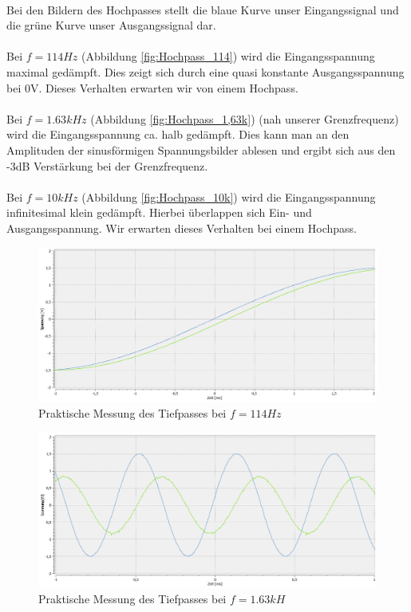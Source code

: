 ~\\
Bei den Bildern des Hochpasses stellt die blaue Kurve unser Eingangssignal und die grüne Kurve unser Ausgangssignal dar.
\\
\\
Bei $f=114Hz$ (Abbildung \ref{fig:Hochpass_114}) wird die Eingangsspannung maximal gedämpft. Dies zeigt sich durch eine quasi konstante Ausgangsspannung bei 0V. Dieses Verhalten erwarten wir von einem Hochpass.
\\
\\
Bei $f=1.63kHz$ (Abbildung \ref{fig:Hochpass_1,63k}) (nah unserer Grenzfrequenz) wird die Eingangsspannung ca. halb gedämpft. Dies kann man an den Amplituden der sinusförmigen Spannungsbilder ablesen und ergibt sich aus den -3dB Verstärkung bei der Grenzfrequenz.
\\
\\
Bei $f=10kHz$ (Abbildung \ref{fig:Hochpass_10k}) wird die Eingangsspannung infinitesimal klein gedämpft. Hierbei überlappen sich Ein- und Ausgangsspannung. Wir erwarten dieses Verhalten bei einem Hochpass.

\newpage
\begin{figure}[htb]
    \includegraphics[width=16cm]{./pictures/Messungen/Tiefpass_114}
    \caption{Praktische Messung des Tiefpasses bei $f=114Hz$}
    \label{fig:Tiefpass_114}
\end{figure}

\begin{figure}[htb]
    \includegraphics[width=16cm]{./pictures/Messungen/Tiefpass_1,63k}
    \caption{Praktische Messung des Tiefpasses bei $f=1.63kH$}
    \label{fig:Tiefpass_1,63k}
\end{figure}

